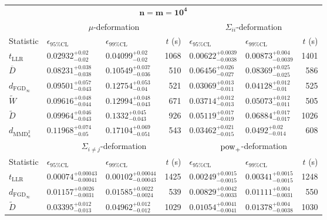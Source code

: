 \begin{tabular}{l|llr|llr}
	\toprule
	\multicolumn{7}{c}{$\mathbf{n=m=10^{4}}$} \\
	\multicolumn{1}{c}{} & \multicolumn{3}{c}{$\mu$-deformation} & \multicolumn{3}{c}{$\Sigma_{ii}$-deformation} \\
	Statistic & $\epsilon_{95\%\mathrm{CL}}$ & $\epsilon_{99\%\mathrm{CL}}$ & $t$ (s) & $\epsilon_{95\%\mathrm{CL}}$ & $\epsilon_{99\%\mathrm{CL}}$ & $t$ (s) \\
	\midrule
	$t_{\mathrm{LLR}}$ & $0.02932_{-0.02}^{+0.02}$ & $0.04099_{-0.02}^{+0.02}$ & 1068 & $0.00622_{-0.0038}^{+0.0039}$ & $0.00873_{-0.0039}^{+0.004}$ & 1401 \\
	$\overline{D}$ & $0.08231_{-0.038}^{+0.038}$ & $0.10549_{-0.036}^{+0.037}$ & 510 & $0.06456_{-0.027}^{+0.026}$ & $0.08369_{-0.025}^{+0.025}$ & 586 \\
	$d_{\mathrm{FGD}_{\infty}}$ & $0.09501_{-0.043}^{+0.057}$ & $0.12754_{-0.04}^{+0.053}$ & 521 & $0.03069_{-0.011}^{+0.013}$ & $0.04128_{-0.01}^{+0.012}$ & 525 \\
	$\widetilde{W}$ & $0.09616_{-0.044}^{+0.048}$ & $0.12994_{-0.043}^{+0.048}$ & 671 & $0.03714_{-0.013}^{+0.012}$ & $0.05073_{-0.011}^{+0.012}$ & 505 \\
	$\widetilde{D}$ & $0.09964_{-0.043}^{+0.046}$ & $0.1332_{-0.043}^{+0.045}$ & 926 & $0.05119_{-0.019}^{+0.017}$ & $0.06884_{-0.017}^{+0.017}$ & 1026 \\
	$d_{\mathrm{MMD}^{2}_{u}}$ & $0.11968_{-0.05}^{+0.074}$ & $0.17104_{-0.051}^{+0.069}$ & 543 & $0.03462_{-0.015}^{+0.021}$ & $0.0492_{-0.014}^{+0.02}$ & 608 \\
	\toprule
	\multicolumn{1}{c}{} & \multicolumn{3}{c}{$\Sigma_{i\neq j}$-deformation} & \multicolumn{3}{c}{$\rm{pow}_{+}$-deformation} \\
	Statistic & $\epsilon_{95\%\mathrm{CL}}$ & $\epsilon_{99\%\mathrm{CL}}$ & $t$ (s) & $\epsilon_{95\%\mathrm{CL}}$ & $\epsilon_{99\%\mathrm{CL}}$ & $t$ (s) \\
	\midrule
	$t_{\mathrm{LLR}}$ & $0.00074_{-0.00041}^{+0.00043}$ & $0.00102_{-0.00043}^{+0.00044}$ & 1425 & $0.00249_{-0.0015}^{+0.0015}$ & $0.00341_{-0.0015}^{+0.0015}$ & 1248 \\
	$d_{\mathrm{FGD}_{\infty}}$ & $0.01157_{-0.0031}^{+0.0026}$ & $0.01585_{-0.0024}^{+0.0022}$ & 539 & $0.00829_{-0.0033}^{+0.0042}$ & $0.01111_{-0.0031}^{+0.004}$ & 550 \\
	$\widetilde{D}$ & $0.03395_{-0.013}^{+0.012}$ & $0.04962_{-0.012}^{+0.012}$ & 1029 & $0.01054_{-0.0041}^{+0.0041}$ & $0.01378_{-0.0038}^{+0.004}$ & 1030 \\

\end{tabular}
